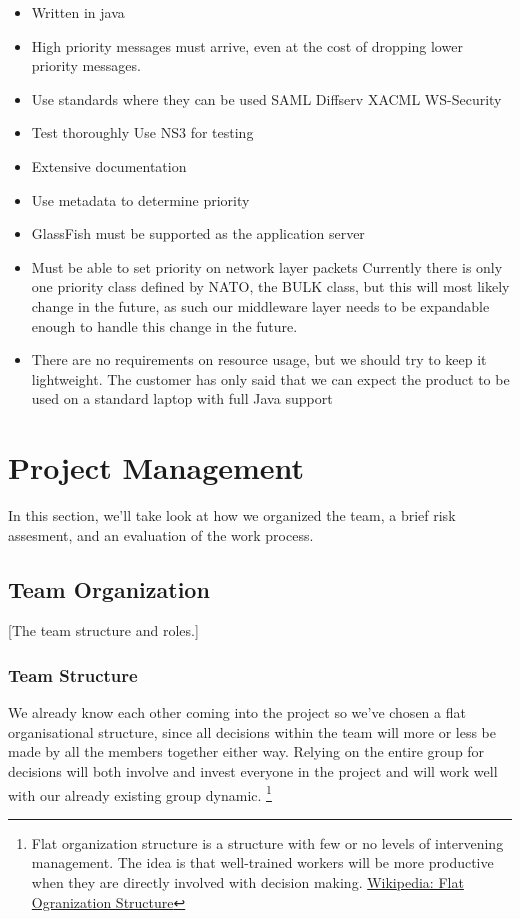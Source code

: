 \documentclass[12pt]{article}
\begin{document}
    \begin{itemize}
        \item Written in java
        \item High priority messages must arrive, even at the cost of dropping lower priority messages.
        \item Use standards where they can be used
            \subitem SAML
            \subitem Diffserv
            \subitem XACML
            \subitem WS-Security
        \item Test thoroughly
            \subitem Use NS3 for testing
        \item Extensive documentation
        \item Use metadata to determine priority
        \item GlassFish must be supported as the application server
        \item Must be able to set priority on network layer packets
            \subitem Currently there is only one priority class defined by NATO, the BULK class, but this will most likely change in the future, as such our middleware layer needs to be expandable enough to handle this change in the future.
        \item There are no requirements on resource usage, but we should try to keep it lightweight.
            \subitem The customer has only said that we can expect the product to be used on a standard laptop with full Java support
    \end{itemize}
    
\section{Project Management}\label{management} 
    In this section, we'll take look at how we organized the team, a brief risk assesment, and an evaluation of the work process. 
    
    \subsection{Team Organization}\label{team} 
        [The team structure and roles.]
    
    \subsubsection{Team Structure}
    We already know each other coming into the project so we’ve chosen a flat organisational structure, since all decisions within the team will more or less be made by all the members together either way. Relying on the entire group for decisions will both involve and invest everyone in the project and will work well with our already existing group dynamic.
    \footnote{ 
        Flat organization structure is a structure with few or no levels of intervening management. The idea is that well-trained workers will be more productive when they are directly involved with decision making. 
        \href{http://en.wikipedia.org/wiki/Flat_organization}{Wikipedia: Flat Ogranization Structure} 
    }
    
\end{document}
